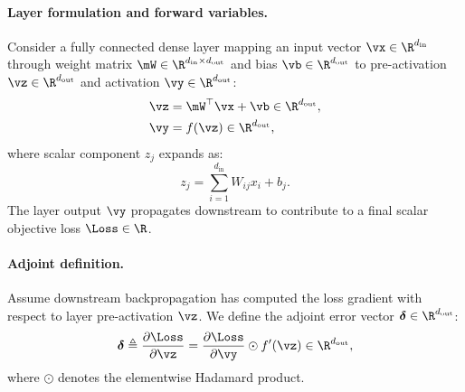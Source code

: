 \documentclass[../../main.tex]{subfiles}
\begin{document}
\paragraph{Layer formulation and forward variables.}
Consider a fully connected dense layer mapping an input vector $\vx \in \R^{d_{\text{in}}}$ through weight matrix $\mW \in \R^{d_{\text{in}} \times d_{\text{out}}}$ and bias $\vb \in \R^{d_{\text{out}}}$ to pre-activation $\vz \in \R^{d_{\text{out}}}$ and activation $\vy \in \R^{d_{\text{out}}}$:
\begin{align}
\vz &= \mW^\top \vx + \vb \in \R^{d_{\text{out}}}, \label{eq:vec_fwd_z} \\
\vy &= f(\vz) \in \R^{d_{\text{out}}}, \label{eq:vec_fwd_y}
\end{align}
where scalar component $z_j$ expands as:
\begin{equation}
z_j = \sum_{i=1}^{d_{\text{in}}} W_{ij} x_i + b_j.
\end{equation}
The layer output $\vy$ propagates downstream to contribute to a final scalar objective loss $\Loss \in \R$.

\paragraph{Adjoint definition.}
Assume downstream backpropagation has computed the loss gradient with respect to layer pre-activation $\vz$. We define the adjoint error vector $\bm{\delta} \in \R^{d_{\text{out}}}$:
\begin{equation}
\label{eq:delta_adjoint_def}
\bm{\delta} \triangleq \frac{\partial \Loss}{\partial \vz} = \frac{\partial \Loss}{\partial \vy} \odot f'(\vz) \in \R^{d_{\text{out}}},
\end{equation}
where $\odot$ denotes the elementwise Hadamard product.
\end{document}
